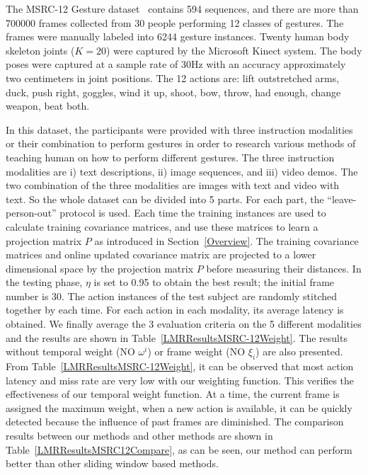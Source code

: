\documentclass[sigconf]{acmart}
\begin{document}
The MSRC-12 Gesture dataset~\cite{fothergill2012instructing}
contains 594 sequences, and there are more than 700000 frames
collected from 30 people performing 12 classes of gestures.
The frames were manually labeled into 6244 gesture instances. Twenty human body
skeleton joints ($K=20$) were captured by the Microsoft Kinect system. The body
poses were captured at a sample rate of 30Hz with an accuracy approximately two
centimeters in joint positions. The 12 actions are: lift outstretched arms, duck, push right, goggles, wind it up, shoot, bow, throw, had enough, change weapon, beat both.


In this dataset, the participants were provided with three
instruction modalities or their combination to perform
gestures in order to research various methods of teaching human on
how to perform different gestures. The three instruction modalities are i) text
descriptions, ii) image sequences, and iii) video demos. The two combination of
the three modalities are images with text and video with text. So the whole
dataset can be divided into 5 parts. For each part, the ``leave-person-out'' protocol
is used. Each time the training instances are used to calculate training
covariance matrices, and use these matrices to learn a projection matrix $P$ as
introduced in Section~\ref{Overview}. The training covariance matrices and
online updated covariance matrix are projected to a lower dimensional space by
the projection matrix $P$ before measuring their distances. In the testing
phase, $\eta$ is set to 0.95 to obtain the best result; the initial frame number
is 30. The action instances of the test subject are randomly stitched together
by each time. For each action in each modality, its average latency is obtained.
We finally average the 3 evaluation criteria on the 5 different modalities and the results
are shown in Table~\ref{LMRResultsMSRC-12Weight}. The results without temporal weight (NO $\omega^i$) or frame weight (NO $\xi_i$) are also presented. From Table~\ref{LMRResultsMSRC-12Weight}, it can be observed
that most action latency and miss rate are very low with our weighting function. This verifies the effectiveness of our temporal weight function. At a time, the current frame is assigned the maximum weight, when a new action is available, it can be quickly detected because the influence of past frames are diminished. The
comparison results between our methods and other methods are shown in Table~\ref{LMRResultsMSRC12Compare}, as can be seen, our method can perform better than other sliding window based methods.
\end{document}
